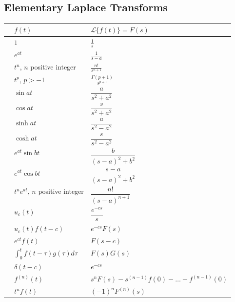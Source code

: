 \documentclass[12pt]{exam}
\begin{document}
\newpage \InitialsLeft \\ \LastPage


\newpage \InitialsRight

\newcommand{\LTNUM}{\stepcounter{NumberInTable}{\theNumberInTable.}}

\vspace{-0ex}
    \renewcommand{\arraystretch}{1.8}
    \begin{center}
    \subsection*{Elementary Laplace Transforms}
    \vspace{.5cm}
    
    \begin{tabular}{ p{1cm} p{6cm} p{8cm} }
        & $f(t)$ & $\mathcal  L\{f(t)\}  =F(s)$ \\ \hline
        \LTNUM & $1$ & $\displaystyle \frac{1}{s}$  \\ 
        \LTNUM & $e^{at}$	& $\displaystyle \frac{1}{s-a}$ \\ 
        \LTNUM & $t^n$, $n$ positive integer	& $\displaystyle \frac{n!}{s^{n+1}}$  \\ 
        \LTNUM & $t^p$, $p > -1$	& $\displaystyle \frac{\Gamma(p+1)}{s^{p+1}}$  \\ 
        \LTNUM &$\sin at$ 	& $\displaystyle \dfrac{a}{s^2+a^2}$ \\ 
        \LTNUM &$\cos at$ 	& $\displaystyle \dfrac{s}{s^2+a^2}$ \\ 
        \LTNUM &$\sinh at$	& $\displaystyle \dfrac{a}{s^2-a^2}$ \\ 
        \LTNUM &$\cosh at$	& $\displaystyle \dfrac{s}{s^2-a^2}$ \\ 
        \LTNUM &$e^{at}\sin bt$	& $\displaystyle \dfrac{b}{(s-a)^2+b^2}$   \\ 
        \LTNUM &$e^{at}\cos bt$	& $\displaystyle \dfrac{s-a}{(s-a)^2+b^2}$  \\ 
        \LTNUM &$t^ne^{at}$, $n$ positive integer	& $\displaystyle \dfrac{n!}{(s-a)^{n+1}}$  \\ 
        \LTNUM &$u_c(t)$	& $\displaystyle \dfrac{e^{-cs}}{s}$  \\ 
        \LTNUM &$u_c(t)f(t-c)$& $\displaystyle e^{-cs}F(s)$  \\ 
        \LTNUM &$e^{ct}f(t)$& $\displaystyle F(s-c)$  \\ 
        \LTNUM &$\int_0^t f(t - \tau) g(\tau) d\tau$& $\displaystyle F(s)G(s)$  \\ 
        \LTNUM &$\delta(t-c)$& $e^{-cs}$  \\ 
        \LTNUM &$f^{(n)}(t)$& $\displaystyle s^nF(s)-s^{(n-1)}f(0) - \ldots -f^{(n-1)}(0)$  \\ 
        \LTNUM & $t^n f(t)$& $\displaystyle (-1)^nF^{(n)}(s)$  \\ 
    \end{tabular}
    \renewcommand{\arraystretch}{.5}

\end{center}
\end{document}
